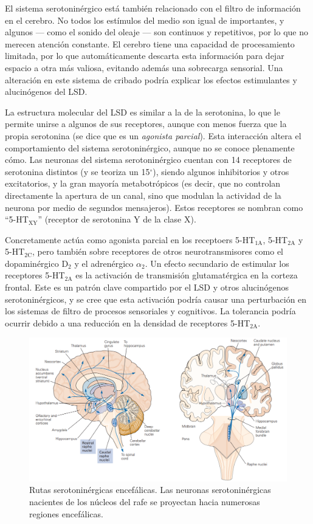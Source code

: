 El sistema serotoninérgico está también relacionado con el filtro de información en el cerebro. No todos los estímulos del medio son igual de importantes, y algunos --- como el sonido del oleaje --- son continuos y repetitivos, por lo que no merecen atención constante. El cerebro tiene una capacidad de procesamiento limitada, por lo que automáticamente descarta esta información para dejar espacio a otra más valiosa, evitando además una sobrecarga sensorial. Una alteración en este sistema de cribado podría explicar los efectos estimulantes y alucinógenos del LSD.

La estructura molecular del LSD es similar a la de la serotonina, lo que le permite unirse a algunos de sus receptores, aunque con menos fuerza que la propia serotonina (se dice que es un \textit{agonista parcial}). Esta interacción altera el comportamiento del sistema serotoninérgico, aunque no se conoce plenamente cómo. Las neuronas del sistema serotoninérgico cuentan con 14 receptores de serotonina distintos (y se teoriza un 15$^\circ$), siendo algunos inhibitorios y otros excitatorios, y la gran mayoría metabotrópicos (es decir, que no controlan directamente la apertura de un canal, sino que modulan la actividad de la neurona por medio de segundos mensajeros). Estos receptores se nombran como \enquote{5-HT$_{\textrm{XY}}$} (receptor de serotonina Y de la clase X).

Concretamente actúa como agonista parcial en los receptoers 5-HT$_{\textrm{1A}}$, 5-HT$_{\textrm{2A}}$ y 5-HT$_{\textrm{2C}}$, pero también sobre receptores de otros neurotransmisores como el dopaminérgico D$_2$ y el adrenérgico $\alpha_2$. Un efecto secundario de estimular los receptores 5-HT$_{\textrm{2A}}$ es la activación de transmisión glutamatérgica en la corteza frontal. Este es un patrón clave compartido por el LSD y otros alucinógenos serotoninérgicos, y se cree que esta activación podría causar una perturbación en los sistemas de filtro de procesos sensoriales y cognitivos. La tolerancia podría ocurrir debido a una reducción en la densidad de receptores 5-HT$_{\textrm{2A}}$.

\begin{figure}[H]
	\centering
	\includegraphics[width=\linewidth]{media/9-pathways.png}
	\caption{Rutas serotoninérgicas encefálicas. Las neuronas serotoninérgicas nacientes de los núcleos del rafe se proyectan hacia numerosas regiones encefálicas.}
	\label{pathways}
\end{figure}

\newpage
